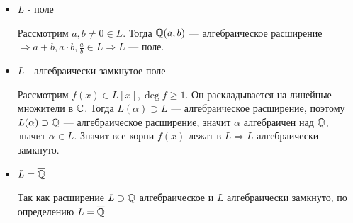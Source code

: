 \begin{itemize}
    \item[а)] $L$ - поле
    \par \Proof Рассмотрим $a,b\neq 0 \in L$. Тогда $\mathbb{Q}(a, b)$ — алгебраическое расширение $\Rightarrow a+b, a \cdot b, \frac{a}{b} \in L \Rightarrow L$ — поле. \EndProof
    
    \item[б)] $L$ - алгебраически замкнутое поле
    \par \Proof Рассмотрим $f(x) \in L[x], \deg f \geq 1$. Он раскладывается на линейные множители в $\mathbb{C}$. Тогда $L(\alpha) \supset L$ — алгебраическое расширение, поэтому $L(\alpha) \supset \mathbb{Q}$ — алгебраическое расширение, значит $\alpha$ алгебраичен над $\mathbb{Q}$, значит $\alpha \in L$. Значит все корни $f(x)$ лежат в $L \Rightarrow L$ алгебраически замкнуто. \EndProof
    
    \item[в)] $L=\overline{\mathbb{Q}}$
    \par \Proof Так как расширение $L \supset \mathbb{Q}$ алгебраическое и $L$ алгебраически замкнуто, по определению $L=\overline{\mathbb{Q}}$ \EndProof
\end{itemize}